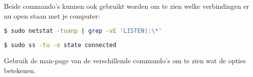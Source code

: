 Beide commando's kunnen ook gebruikt worden om te zien welke verbindingen er nu open staan met je computer:
\begin{lstlisting}[language=bash]
$ sudo netstat -tuanp | grep -vE 'LISTEN|:\*'
\end{lstlisting}
\begin{lstlisting}[language=bash]
$ sudo ss -tu -o state connected
\end{lstlisting}
Gebruik de man-page van de verschillende commando's om te zien wat de opties betekenen.

